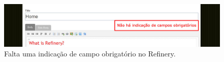 \begin{figure}[here]
\includegraphics[width=150mm]{images/refinery_erro_campos_obrigatorios.jpg}
\caption{Falta uma indicação de campo obrigatório no Refinery. }
\label{fig:campos_obrigatorios_refinery}
\end{figure}

